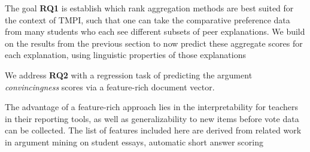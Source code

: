 \documentclass[notitlepage,12pt]{jedm}
\begin{document}
The goal \textbf{RQ1} is establish which rank aggregation methods are best 
suited for the context of TMPI, such that one can take the comparative 
preference data from many students who each see different subsets of peer 
explanations.
We build on the results from the previous section to now predict these 
aggregate scores for each explanation, using 
linguistic properties of those explanations



We address \textbf{RQ2} with a regression task of predicting the argument 
\textit{convincingness} scores via a feature-rich document vector.


The advantage of a feature-rich approach lies in the interpretability for 
teachers in their reporting tools, as well as generalizability to new items 
before vote data can be collected.
The list of features included here are derived from related work in argument 
mining \cite{habernal_which_2016}\cite{persing_end--end_2016}on student essays, 
automatic short answer scoring \cite{mohler_text--text_2009}
\end{document}
